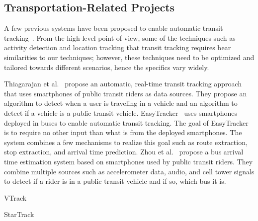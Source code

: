 \subsection{Transportation-Related Projects}

A few previous systems have been proposed to enable automatic transit
tracking~\cite{Biagioni:2011:EAT, Thiagarajan:2010:CTT, Zhou:2012:LWP}. From the
high-level point of view, some of the techniques such as activity detection and
location tracking that transit tracking requires bear similarities to
our techniques; however, these techniques need to be optimized and tailored
towards different scenarios, hence the specifics vary widely.

Thiagarajan et al.~\cite{Thiagarajan:2010:CTT} propose an automatic, real-time
transit tracking approach that uses smartphones of public transit riders as data
sources. They propose an algorithm to detect when a user is traveling in a
vehicle and an algorithm to detect if a vehicle is a public transit vehicle.
EasyTracker~\cite{Biagioni:2011:EAT} uses smartphones deployed in buses to
enable automatic transit tracking. The goal of EasyTracker is to require no
other input than what is from the deployed smartphones. The system combines a
few mechanisms to realize this goal such as route extraction, stop extraction,
and arrival time prediction. Zhou et al.~\cite{Zhou:2012:LWP} propose a bus
arrival time estimation system based on smartphones used by public transit
riders. They combine multiple sources such as accelerometer data, audio, and
cell tower signals to detect if a rider is in a public transit vehicle and if
so, which bus it is.

VTrack~\cite{Thiagarajan:2009:VAE}

StarTrack~\cite{Ananthanarayanan:2009:SFE}
